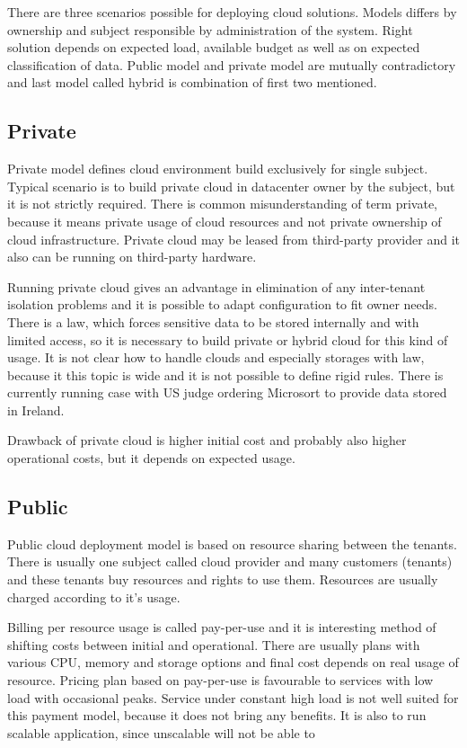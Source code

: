
There are three scenarios possible for deploying cloud solutions. Models differs by ownership and subject responsible by administration of the system. Right solution depends on expected load, available budget as well as on expected classification of data. Public model and private model are mutually contradictory and last model called hybrid is combination of first two mentioned.

\subsection{Private}
Private model defines cloud environment build exclusively for single subject. Typical scenario is to build private cloud in datacenter owner by the subject, but it is not strictly required. There is common misunderstanding of term private, because it means private usage of cloud resources and not private ownership of cloud infrastructure. Private cloud may be leased from third-party provider and it also can be running on third-party hardware.

Running private cloud gives an advantage in elimination of any inter-tenant isolation problems and it is possible to adapt configuration to fit owner needs. There is a law, which forces sensitive data to be stored internally and with limited access, so it is necessary to build private or hybrid cloud for this kind of usage. It is not clear how to handle clouds and especially storages with law, because it this topic is wide and it is not possible to define rigid rules. There is currently running case with \Ac{US} judge ordering Microsort to provide data stored in Ireland. \cite{wp-microsoft-ireland}

Drawback of private cloud is higher initial cost and probably also higher operational costs, but it depends on expected usage.

\subsection{Public}
Public cloud deployment model is based on resource sharing between the tenants. There is usually one subject called cloud provider and many customers (tenants) and these tenants buy resources and rights to use them. Resources are usually charged according to it's usage.

Billing per resource usage is called pay-per-use and it is interesting method of shifting costs between initial and operational. There are usually plans with various \Ac{CPU}, memory and storage options and final cost depends on real usage of resource. Pricing plan based on pay-per-use is favourable to services with low load with occasional peaks. Service under constant high load is not well suited for this payment model, because it does not bring any benefits. It is also to run scalable application, since unscalable will not be able to 

